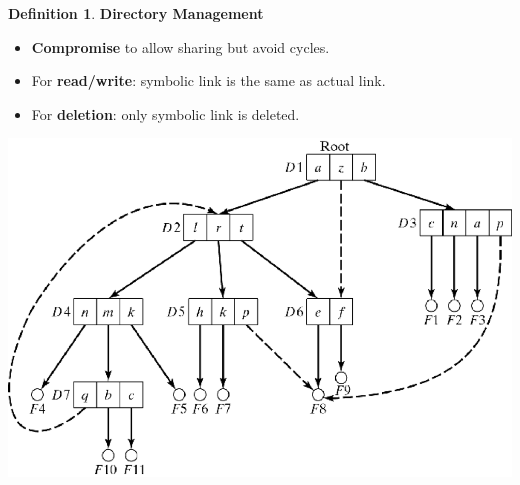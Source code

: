 \documentclass[11pt,a4paper]{article}
\theoremstyle{definition}
\newtheorem{definition}{Definition}[section]
\newenvironment{myitemize}
{ \begin{itemize}
    \setlength{\itemsep}{5pt}
    \setlength{\parskip}{0pt}
    \setlength{\parsep}{0pt}     }
{ \end{itemize}                  }
\begin{document}
\begin{definition}{\textbf{Directory Management}}
\begin{myitemize}
\begin{myitemize}
		\begin{myitemize}
			\item \textbf{Compromise} to allow sharing but avoid cycles.
			\item For \textbf{read/write}: symbolic link is the same as actual link.
			\item For \textbf{deletion}: only symbolic link is deleted.
		\end{myitemize}
		\begin{center}
			\includegraphics[scale=0.3]{m2/symbolicStructureFile}
		\end{center}
	\end{myitemize}
\end{myitemize}
\end{definition}
\end{document}
